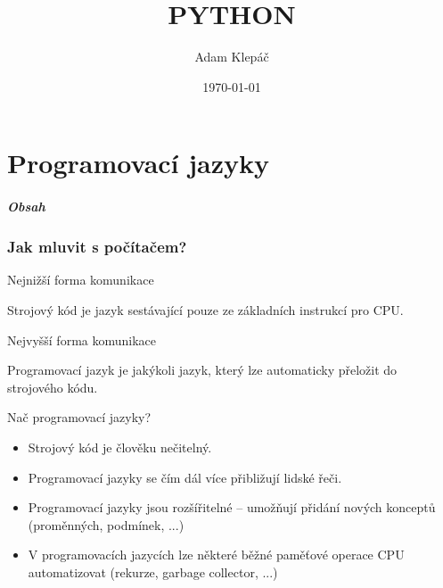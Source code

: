 \documentclass[aspectratio=169,11pt]{beamer}
\title{PYTHON}
\date{\today}
\author{Adam Klepáč}
\institute[GEVO]{Gymnázium Evolution Jižní Město}
\begin{document}
\maketitle

\part[Programovací jazyky]{Programovací jazyky}

\begin{frame}[plain]
 \partpage
\end{frame}

\begin{frame}
 \frametitle{Obsah}
 \tableofcontents
\end{frame}

\section[Jak mluvit s počítačem?]{Jak mluvit s počítačem?}

\begin{frame}{Nejnižší forma komunikace}
 \begin{tcolorbox}[title=Strojový kód]
  Strojový kód je jazyk sestávající pouze ze \alert{základních instrukcí} pro
  CPU.
 \end{tcolorbox}
\end{frame}

\begin{frame}{Nejvyšší forma komunikace}
 \begin{tcolorbox}[title=Programovací jazyk]
  Programovací jazyk je jakýkoli jazyk, který lze \alert{automaticky přeložit}
  do strojového kódu.
 \end{tcolorbox}
\end{frame}

\begin{frame}{Nač programovací jazyky?}
 \begin{itemize}
  \item<1-> Strojový kód je člověku nečitelný.
  \item<2-> Programovací jazyky se čím dál více přibližují lidské řeči.
  \item<3-> Programovací jazyky jsou rozšířitelné -- umožňují přidání nových
   konceptů (proměnných, podmínek, ...)
  \item<4-> V programovacích jazycích lze některé běžné paměťové operace CPU
   automatizovat (rekurze, garbage collector, ...)
 \end{itemize}
\end{frame}
\end{document}
